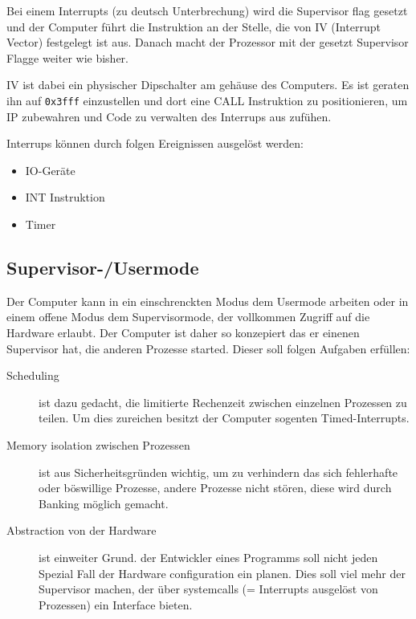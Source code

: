 \documentclass{scrartcl}
\begin{document}
Bei einem Interrupts (zu deutsch Unterbrechung) wird die Supervisor flag gesetzt und der Computer führt die Instruktion an der Stelle, die von IV (Interrupt Vector) festgelegt ist aus. Danach macht der Prozessor mit der gesetzt Supervisor Flagge weiter wie bisher.

IV ist dabei ein physischer Dipschalter am gehäuse des Computers. Es ist geraten ihn auf \texttt{0x3fff} einzustellen und dort eine CALL Instruktion zu positionieren, um IP zubewahren und Code zu verwalten des Interrups aus zufühen.

Interrups können durch folgen Ereignissen ausgelöst werden:

\begin{itemize}
	\item IO-Geräte
	\item INT Instruktion
	\item Timer
\end{itemize}

\subsection{\label{section:supervisor}Supervisor-/Usermode}

Der Computer kann in ein einschrenckten Modus dem Usermode arbeiten oder in einem offene Modus dem Supervisormode, der vollkommen Zugriff auf die Hardware erlaubt. Der Computer ist daher so konzepiert das er einenen Supervisor hat, die anderen Prozesse started. Dieser soll folgen Aufgaben erfüllen:

\begin{description}
	\item[Scheduling] ist dazu gedacht, die limitierte Rechenzeit zwischen einzelnen Prozessen zu teilen. Um dies zureichen besitzt der Computer sogenten Timed-Interrupts.

	\item[Memory isolation zwischen Prozessen] ist aus Sicherheitsgründen wichtig, um zu verhindern das sich fehlerhafte oder böswillige Prozesse, andere Prozesse nicht stören, diese wird durch Banking möglich gemacht.

	\item[Abstraction von der Hardware] ist einweiter Grund. der Entwickler eines Programms soll nicht jeden Spezial Fall der Hardware configuration ein planen. Dies soll viel mehr der Supervisor machen, der über systemcalls (= Interrupts ausgelöst von Prozessen) ein Interface bieten. 
\end{description}
\end{document}
